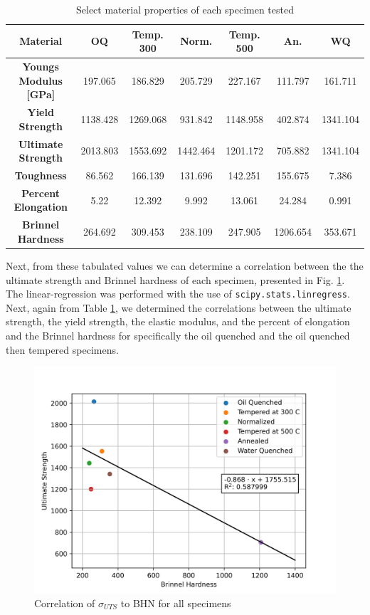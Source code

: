 \documentclass{article}
\begin{document}
\begin{table}[!h!]
    \centering
    \renewcommand{\arraystretch}{1.5}
    \caption{Select material properties of each specimen tested}
    \begin{tabular}{|c|c|c|c|c|c|c|}
        \toprule
        \hline
        \textbf{Material} & \textbf{OQ} & \textbf{Temp. 300} & \textbf{Norm.} & \textbf{Temp. 500} & \textbf{An.} & \textbf{WQ} \\ 
        \midrule
        \hline 
        \textbf{Youngs Modulus [GPa]} & 197.065 & 186.829 & 205.729 & 227.167 & 111.797 & 161.711 \\ 
        \hline 
        \textbf{Yield Strength} & 1138.428 & 1269.068 & 931.842 & 1148.958 & 402.874 & 1341.104 \\ 
        \hline 
        \textbf{Ultimate Strength} & 2013.803 & 1553.692 & 1442.464 & 1201.172 & 705.882 & 1341.104 \\ 
        \hline 
        \textbf{Toughness} & 86.562 & 166.139 & 131.696 & 142.251 & 155.675 & 7.386 \\ 
        \hline 
        \textbf{Percent Elongation} & 5.22 & 12.392 & 9.992 & 13.061 & 24.284 & 0.991 \\ 
        \hline 
        \textbf{Brinnel Hardness} & 264.692 & 309.453 & 238.109 & 247.905 & 1206.654 & 353.671 \\ 
        \hline 
    \end{tabular}
    \label{tab:q2}
\end{table}

Next, from these tabulated values we can determine a correlation between the  the ultimate strength and Brinnel hardness of each specimen, presented in Fig. \ref{fig:q4}. The linear-regression was performed with the use of \texttt{scipy.stats.linregress}. Next, again from Table \ref{tab:q2}, we determined the correlations between the ultimate strength, the yield strength, the elastic modulus, and the percent of elongation and the Brinnel hardness for specifically the oil quenched and the oil quenched then tempered specimens.

\begin{figure}[!h!]
    \centering
    \includegraphics[width=0.5\linewidth]{plots/q4.png}
    \caption{Correlation of $\sigma_{UTS}$ to BHN for all specimens}
    \label{fig:q4}
\end{figure}
\end{document}
